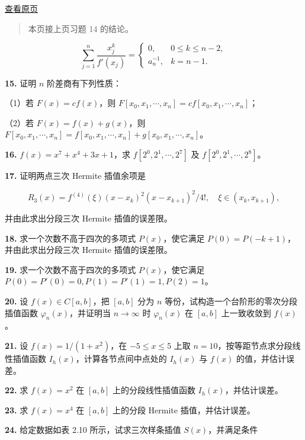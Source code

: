 \documentclass[
  10pt,
  fontset=fandol]{ctexart}
\begin{document}
\href{../../source-images/pdf-057.jpeg}{查看原页}

\begin{quote}
本页接上页习题 14 的结论。
\end{quote}

\[\sum_{j=1}^n\frac{x_j^k}{f'(x_j)}=\begin{cases}0,&0\leqslant k\leqslant n-2,\\a_n^{-1},&k=n-1.\end{cases}\]

\textbf{15.} 证明 \(n\) 阶差商有下列性质：

（1）若 \(F(x)=cf(x)\)，则 \(F[x_0,\allowbreak x_1,\allowbreak \cdots,\allowbreak x_n]=cf[x_0,\allowbreak x_1,\allowbreak \cdots,\allowbreak x_n]\)；

（2）若 \(F(x)=f(x)+g(x)\)，则 \(F[x_0,\allowbreak x_1,\allowbreak \cdots,\allowbreak x_n]=f[x_0,\allowbreak x_1,\allowbreak \cdots,\allowbreak x_n]+g[x_0,\allowbreak x_1,\allowbreak \cdots,\allowbreak x_n]\)。

\textbf{16.} \(f(x)=x^7+x^4+3x+1\)，求 \(f[2^0,2^1,\cdots,2^7]\) 及 \(f[2^0,2^1,\cdots,2^8]\)。

\textbf{17.} 证明两点三次 Hermite 插值余项是

\[R_3(x)=f^{(4)}(\xi)(x-x_k)^2(x-x_{k+1})^2/4!,\quad\xi\in(x_k,x_{k+1}),\]

并由此求出分段三次 Hermite 插值的误差限。

\textbf{18.} 求一个次数不高于四次的多项式 \(P(x)\)，使它满足 \(P(0)=P(-k+1)\)，并由此求出分段三次 Hermite 插值的误差限。

\textbf{19.} 求一个次数不高于四次的多项式 \(P(x)\)，使它满足 \(P(0)=P'(0)=0,P(1)=P'(1)=1,P(2)=1\)。

\textbf{20.} 设 \(f(x)\in C[a,b]\)，把 \([a,b]\) 分为 \(n\) 等份，试构造一个台阶形的零次分段插值函数 \(\varphi_n(x)\)，并证明当 \(n\to\infty\) 时 \(\varphi_n(x)\) 在 \([a,b]\) 上一致收敛到 \(f(x)\)。

\textbf{21.} 设 \(f(x)=1/(1+x^2)\)，在 \(-5\leqslant x\leqslant5\) 上取 \(n=10\)，按等距节点求分段线性插值函数 \(I_h(x)\)，计算各节点间中点处的 \(I_h(x)\) 与 \(f(x)\) 的值，并估计误差。

\textbf{22.} 求 \(f(x)=x^2\) 在 \([a,b]\) 上的分段线性插值函数 \(I_h(x)\)，并估计误差。

\textbf{23.} 求 \(f(x)=x^4\) 在 \([a,b]\) 上的分段 Hermite 插值，并估计误差。

\textbf{24.} 给定数据如表 2.10 所示，试求三次样条插值 \(S(x)\)，并满足条件
\end{document}
